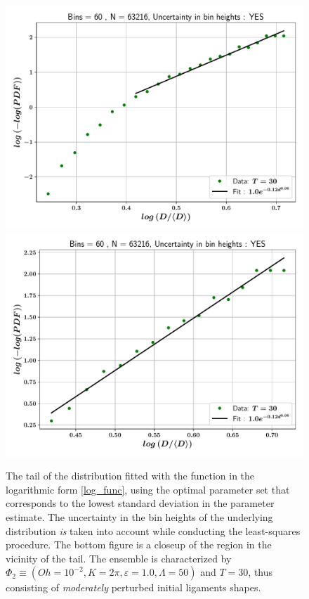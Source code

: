 
\begin{figure}
\centering
\includegraphics{plots/drop_stats/log_tail_fit_uncertainty_yes.pdf} \\
\includegraphics{plots/drop_stats/log_zoom_tail_fit_uncertainty_yes.pdf} \\ 
\caption{
	The tail of the distribution fitted with the function 
	in the logarithmic form \eqref{log_func}, using the optimal parameter
	set that corresponds to the lowest standard deviation in the parameter estimate.
	The uncertainty in the bin heights of the underlying distribution \textit{is} 
	taken into account while conducting the least-squares procedure. 
	The bottom figure is a closeup of the region in the vicinity of the tail.
	The ensemble is characterized by $\Phi_2 \equiv \left( Oh = 10^{-2}, K = 2\pi 
	, \varepsilon = 1.0 , \Lambda = 50 \right)$ and $T = 30$, 
	thus consisting of \textit{moderately} perturbed initial ligaments shapes. 
	}
\label{log_fits_with}
\end{figure}

